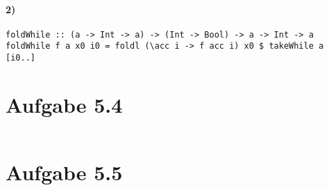 \documentclass[a4paper]{scrartcl}
\begin{document}
\paragraph{2)}
\begin{verbatim}
foldWhile :: (a -> Int -> a) -> (Int -> Bool) -> a -> Int -> a
foldWhile f a x0 i0 = foldl (\acc i -> f acc i) x0 $ takeWhile a [i0..]
\end{verbatim}


\section*{Aufgabe 5.4}
\inputminted{haskell}{binary.hs }


\section*{Aufgabe 5.5}
\inputminted{haskell}{zipper.hs}
\end{document}
